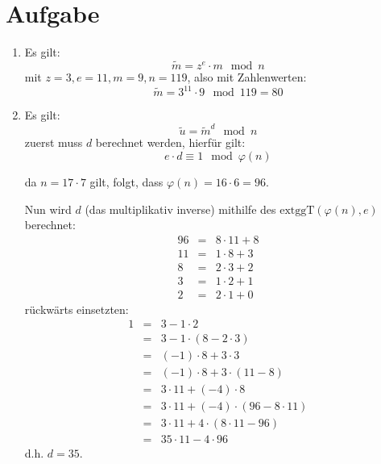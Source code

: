 \documentclass[DIN, pagenumber=false, fontsize=11pt, parskip=half]{scrartcl}
\begin{document}
    \section{Aufgabe}
    \begin{enumerate}[label=\alph*)]
        \item 
            Es gilt:
            \begin{equation}
                \tilde{m} = z^e \cdot m \mod n
            \end{equation}
            mit $z=3, e=11, m=9, n=119$, also mit Zahlenwerten:
            \begin{equation}
                \tilde{m} = 3^{11} \cdot 9 \mod 119 = 80
            \end{equation}
        \item
            Es gilt:
            \begin{equation}
                \tilde{u} = \tilde{m}^d \mod n
            \end{equation}
            zuerst muss $d$ berechnet werden, hierfür gilt:
            \begin{equation}
                e \cdot d \equiv 1 \mod \varphi(n)
            \end{equation} 

            da $n=17 \cdot 7$ gilt, folgt, dass $\varphi(n) = 16 \cdot 6 = 96$.
            
            Nun wird $d$ (das multiplikativ inverse) mithilfe des 
            $\text{extggT}(\varphi(n), e)$ berechnet:
            \begin{eqnarray}
                96 &=& 8 \cdot 11 + 8 \\
                11 &=& 1 \cdot 8 + 3 \\
                8 &=&  2 \cdot 3 + 2 \\
                3 &=& 1 \cdot 2 + 1 \\
                2 &=& 2 \cdot 1 + 0
            \end{eqnarray}
            rückwärts einsetzten:
            \begin{eqnarray}
                1 &=& 3 - 1 \cdot 2 \\ 
                  &=& 3 - 1 \cdot (8 - 2 \cdot 3) \\
                  &=& (-1) \cdot 8 + 3 \cdot 3\\
                  &=& (-1) \cdot 8 + 3 \cdot (11 - 8)\\
                  &=& 3 \cdot 11 + (-4) \cdot 8  \\
                  &=& 3 \cdot 11 + (-4) \cdot (96 - 8 \cdot 11)  \\
                  &=& 3 \cdot 11 + 4 \cdot (8 \cdot 11 - 96)  \\
                  &=& 35 \cdot 11 - 4 \cdot 96 
            \end{eqnarray}
            d.h. $d=35$.


\end{enumerate}
\end{document}
